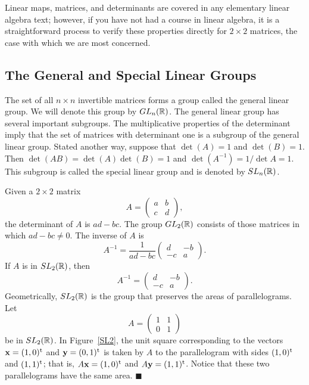 
Linear maps, matrices, and determinants are covered in any elementary
linear algebra text; however, if you have not had a course in linear
algebra, it is a straightforward process to verify these properties
directly for $2 \times 2$ matrices, the case with which we are most
concerned. 
 
 
 
\subsection*{The General and Special Linear Groups}
 
 
 
The set of all $n \times n$  invertible matrices forms a group called
the {\bfi general linear group}.  We will
denote this group by $GL_n({\Bbb R})$.  The general linear group has
several important subgroups. The multiplicative properties of the
determinant imply that the set of matrices with determinant one is a
subgroup of the general linear group.  Stated another way, suppose
that $\det(A) =1$ and $\det(B) = 1$. Then $\det(AB) = \det(A) \det (B)
= 1$ and $\det(A^{-1}) = 1 / \det A = 1$. This subgroup is called the
{\bfi special linear group\/} and is
denoted by $SL_n({\Bbb R})$. 
 
 
\vspace{1.5ex}
 
 
Given a $2 \times 2$ matrix
\[
A =
\left(
\begin{array}{cc}
a & b \\
c & d
\end{array}
\right),
\]
the determinant of $A$ is \mbox{$ad-bc$}. The group $GL_2({\Bbb R})$
consists of those matrices in which $ad-bc \neq 0$. The inverse of $A$
is 
\[
A^{-1} =
\frac{1}{ad-bc}
\left(
\begin{array}{cc}
d & -b \\
-c & a
\end{array}
\right).
\]
If $A$ is in $SL_2({\Bbb R})$, then
\[
A^{-1} =
\left(
\begin{array}{cc}
d & -b \\
-c & a
\end{array}
\right).
\]
Geometrically, $SL_2({\Bbb R})$ is the group that preserves the areas
of parallelograms.  Let 
\[
A =
\left(
\begin{array}{cc}
1 & 1 \\
0 & 1
\end{array}
\right)
\]
be in $SL_2({\Bbb R})$. In Figure~\ref{SL2}, the unit square
corresponding to the vectors ${\bold x} = (1,0)^{\rm t}$ and ${\bold
y} =  (0,1)^{\rm t}$ is taken  by $A$ to the parallelogram with sides
$(1,0)^{\rm t}$ and $(1, 1)^{\rm t}$; that is, $A {\bold x} =
(1,0)^{\rm t}$ and $A {\bold y} = (1, 1)^{\rm t}$. Notice that these
two parallelograms have the same area.   
\hspace{\fill} $\blacksquare$
 

